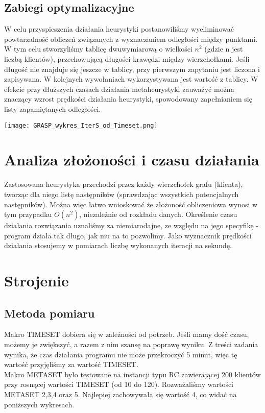 \documentclass[a4paper]{article}
\begin{document}
\subsection{Zabiegi optymalizacyjne}
W celu przyspieszenia działania heurystyki postanowiliśmy wyeliminować powtarzalność obliczeń związanych z wyznaczaniem odległości między punktami. W tym celu stworzyliśmy tablicę dwuwymiarową o wielkości $n^2$ (gdzie n jest liczbą klientów), przechowującą długości krawędzi między wierzchołkami. Jeśli długość nie znajduje się jeszcze w tablicy, przy pierwszym zapytaniu jest liczona i zapisywana. W kolejnych wywołaniach wykorzystywana jest wartość z tablicy. W efekcie przy dłuższych czasach działania metaheurystyki zauważyć można znaczący wzrost prędkości działania heurystyki, spowodowany zapełnianiem się listy zapamiętanych odległości.
\begin{center}
\texttt{[image: GRASP\_wykres\_IterS\_od\_Timeset.png]}
\end{center}
\section{Analiza złożoności i czasu działania}
Zastosowana heurystyka przechodzi przez każdy wierzchołek grafu (klienta), tworząc dla niego listę następników (sprawdzając wszystkich potencjalnych następników). Można więc łatwo wnioskować że złożoność obliczeniowa wynosi w tym przypadku $O(n^2)$, niezależnie od rozkładu danych. Określenie czasu działania rozwiązania uznaliśmy za niemiarodajne, ze względu na jego specyfikę - program działa tak długo, jak mu na to pozwolimy. Jako wyznacznik prędkości działania stosujemy w pomiarach liczbę wykonanych iteracji na sekundę.


\section{Strojenie}
\subsection{Metoda pomiaru}
Makro TIMESET dobiera się w zależności od potrzeb. Jeśli mamy dość czasu, możemy je zwiększyć, a razem z nim szansę na poprawę wyniku. Z treści zadania wynika, że czas działania programu nie może przekroczyć 5 minut, więc tę wartość przyjęliśmy za wartość TIMESET.\\
Makro METASET było testowane na instancji typu RC zawierającej 200 klientów przy rosnącej wartości TIMESET (od 10 do 120). Rozważaliśmy wartości METASET 2,3,4 oraz 5. Najlepiej zachowywała się wartość 4, co widać na poniższych wykresach.
\end{document}
